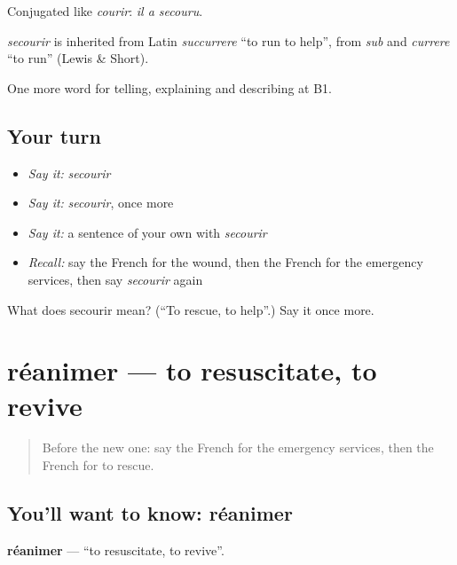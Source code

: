 Conjugated like \emph{courir}: \emph{il a secouru}.

\begin{cousinweb}
\emph{secourir} is inherited from Latin \emph{succurrere} \textquotedblleft{}to run to help\textquotedblright{}, from \emph{sub} and \emph{currere} \textquotedblleft{}to run\textquotedblright{} (Lewis \& Short).
\end{cousinweb}

\begin{grammarlens}[title={What you've built}]
One more word for telling, explaining and describing at B1.
\end{grammarlens}

\subsection*{Your turn}
\begin{itemize}
\raggedright
  \item \emph{Say it:} \emph{secourir}
  \item \emph{Say it:} \emph{secourir}, once more
  \item \emph{Say it:} a sentence of your own with \emph{secourir}
  \item \emph{Recall:} say the French for the wound, then the French for the emergency services, then say \emph{secourir} again
\end{itemize}

\begin{tcolorbox}[breakable,colback=teal!4,colframe=teal!35!black,title={Before you move on}]
What does secourir mean? (\textquotedblleft{}To rescue, to help\textquotedblright{}.) Say it once more.
\end{tcolorbox}
\section[réanimer]{réanimer — to resuscitate, to revive}

\label{lesson:FR-C300-reanimer}



\begin{quote}
Before the new one: say the French for the emergency services, then the French for to rescue.
\end{quote}

\subsection*{You'll want to know: réanimer}
\textbf{réanimer} — \textquotedblleft{}to resuscitate, to revive\textquotedblright{}.

